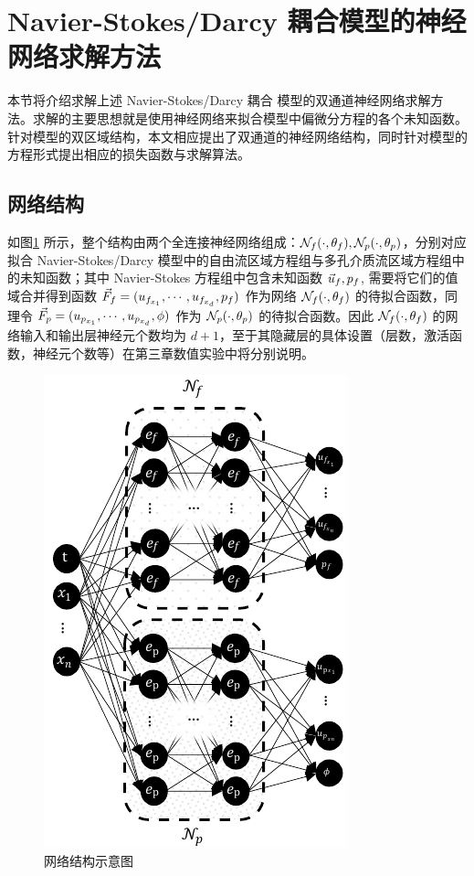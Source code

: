 
\section{Navier-Stokes/Darcy 耦合模型的神经网络求解方法}

本节将介绍求解上述 Navier-Stokes/Darcy 耦合 模型的双通道神经网络求解方法。求解的主要思想就是使用神经网络来拟合模型中偏微分方程的各个未知函数。针对模型的双区域结构，本文相应提出了双通道的神经网络结构，同时针对模型的方程形式提出相应的损失函数与求解算法。

\subsection{网络结构}
\newcommand{\NNFf}{\NN_f(\cdot,\params_f)}
\newcommand{\NNFp}{\NN_p(\cdot,\params_p)}
如图\ref{fig:network} 所示，整个结构由两个全连接神经网络组成：$\NNFf, \NNFp$，分别对应拟合 Navier-Stokes/Darcy 模型中的自由流区域方程组与多孔介质流区域方程组中的未知函数；其中 Navier-Stokes 方程组中包含未知函数 $\Uf,\pf$, 需要将它们的值域合并得到函数 $\vec{F}_f = ( \Ufi[1],\cdots,\Ufi[d],\pf)$ 作为网络 $\NNFf$ 的待拟合函数，同理令 $\vec{F}_p = (\Upi[1],\cdots,\Upi[d],\pp)$ 作为 $\NNFp$ 的待拟合函数。因此 $\NNFf$ 的网络输入和输出层神经元个数均为 $d+1$，至于其隐藏层的具体设置（层数，激活函数，神经元个数等）在第三章数值实验中将分别说明。

\begin{figure}[H]
  \centering
  \includegraphics[width=0.5\linewidth]{images/网络结构1.pdf}
  \caption*{}
  \caption{网络结构示意图}
  \label{fig:network}
\end{figure}

